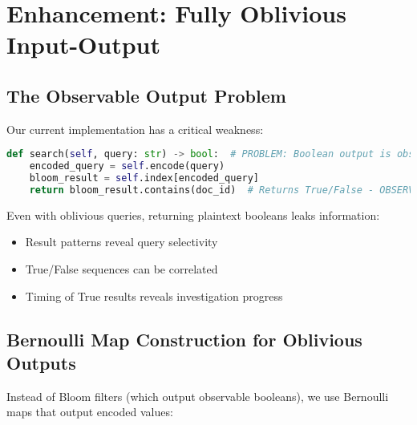 \section{Enhancement: Fully Oblivious Input-Output}
\label{sec:oblivious-io}

\subsection{The Observable Output Problem}

Our current implementation has a critical weakness:

\begin{lstlisting}[language=Python, caption={Current approach - outputs are observable}]
def search(self, query: str) -> bool:  # PROBLEM: Boolean output is observable!
    encoded_query = self.encode(query)
    bloom_result = self.index[encoded_query]
    return bloom_result.contains(doc_id)  # Returns True/False - OBSERVABLE!
\end{lstlisting}

Even with oblivious queries, returning plaintext booleans leaks information:
\begin{itemize}
\item Result patterns reveal query selectivity
\item True/False sequences can be correlated
\item Timing of True results reveals investigation progress
\end{itemize}

\subsection{Bernoulli Map Construction for Oblivious Outputs}

Instead of Bloom filters (which output observable booleans), we use Bernoulli maps that output encoded values:

